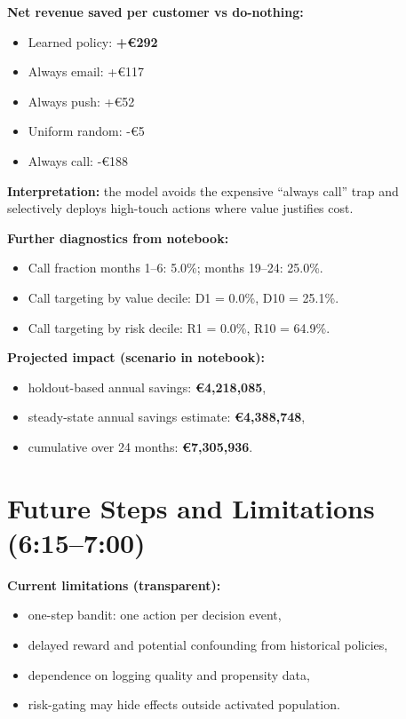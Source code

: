 \documentclass[11pt,a4paper]{article}
\providecommand{\EUR}[1]{\euro{}#1}
\begin{document}
\textbf{Net revenue saved per customer vs do-nothing:}
\begin{itemize}
    \item Learned policy: \textbf{+\EUR{292}}
    \item Always email: +\EUR{117}
    \item Always push: +\EUR{52}
    \item Uniform random: -\EUR{5}
    \item Always call: -\EUR{188}
\end{itemize}

\textbf{Interpretation:} the model avoids the expensive ``always call'' trap and selectively deploys high-touch actions where value justifies cost.

\textbf{Further diagnostics from notebook:}
\begin{itemize}
    \item Call fraction months 1--6: 5.0\%; months 19--24: 25.0\%.
    \item Call targeting by value decile: D1 = 0.0\%, D10 = 25.1\%.
    \item Call targeting by risk decile: R1 = 0.0\%, R10 = 64.9\%.
\end{itemize}

\textbf{Projected impact (scenario in notebook):}
\begin{itemize}
    \item holdout-based annual savings: \textbf{\EUR{4,218,085}},
    \item steady-state annual savings estimate: \textbf{\EUR{4,388,748}},
    \item cumulative over 24 months: \textbf{\EUR{7,305,936}}.
\end{itemize}

\section{Future Steps and Limitations (6:15--7:00)}
\textbf{Current limitations (transparent):}
\begin{itemize}
    \item one-step bandit: one action per decision event,
    \item delayed reward and potential confounding from historical policies,
    \item dependence on logging quality and propensity data,
    \item risk-gating may hide effects outside activated population.
\end{itemize}
\end{document}
